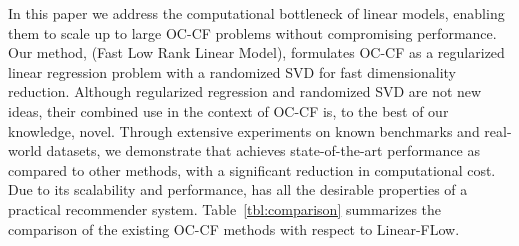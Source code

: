 In this paper we address the computational bottleneck of linear models, enabling them to scale up to large OC-CF problems without compromising performance. Our method, \LinearLow (Fast Low Rank Linear Model), formulates OC-CF as a regularized linear regression problem with a randomized SVD for fast dimensionality reduction.
Although regularized regression and randomized SVD are not new ideas,  their combined use in the context of OC-CF is,  to the best of our knowledge, novel.
Through extensive experiments on known benchmarks and real-world datasets, we demonstrate that \LinearLow achieves state-of-the-art performance as
compared to other methods, with a significant reduction in computational cost.  Due to its scalability and performance,
\LinearLow has all the desirable properties of a practical recommender system. Table~\ref{tbl:comparison} summarizes the comparison of the existing OC-CF methods with respect to Linear-FLow.

